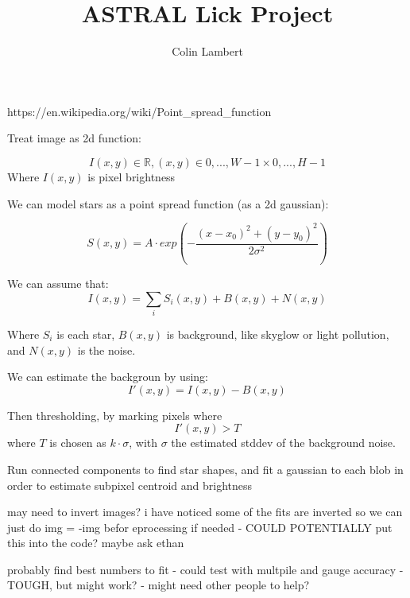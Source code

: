 \documentclass{article}
\title{ASTRAL Lick Project}
\author{Colin Lambert}
\date{Last Updated: 2025-\usepackage{hyperref}09-25 23:07}
\begin{document}
\maketitle

https://en.wikipedia.org/wiki/Point\_spread\_function

Treat image as 2d function:

\begin{equation}
    
    \label{eq:image}
    I(x,y) \in \mathbb{R}, (x,y) \in {0,...,W-1} \times {0,...,H-1}
\end{equation}
Where $ I(x,y) $ is pixel brightness


We can model stars as a point spread function (as a 2d gaussian):

\begin{equation}
    
    \label{eq:psf}
    S(x,y) = A\cdot exp(-\frac{(x-x_0)^2+(y-y_0)^2}{2\sigma^2})
\end{equation}


We can assume that:
\begin{equation}
    
    \label{eq:total}
    I(x,y) = \sum_i{S_i(x,y) + B(x,y) + N(x,y)}
\end{equation}

Where $S_i$ is each star, $B(x,y)$ is background, like skyglow or light pollution, and $N(x,y)$ is the noise.



We can estimate the backgroun by using:
\[ 
I\prime(x,y) = I(x,y) - B(x,y)
\]

Then thresholding, by marking pixels where 
\[
I\prime(x,y) > T
\]
where $T$ is chosen as $k\cdot\sigma$, with $\sigma$ the estimated stddev of the background noise. 

Run connected components to find star shapes, and fit a gaussian to each blob in order to estimate subpixel centroid and brightness



may need to invert images?
i have noticed some of the fits are inverted so we can just do img  = -img befor eprocessing if needed - COULD POTENTIALLY put this into the code? maybe ask ethan



probably find best numbers to fit - could test with multpile and gauge accuracy - TOUGH, but might work? - might need other people to help?
\end{document}
